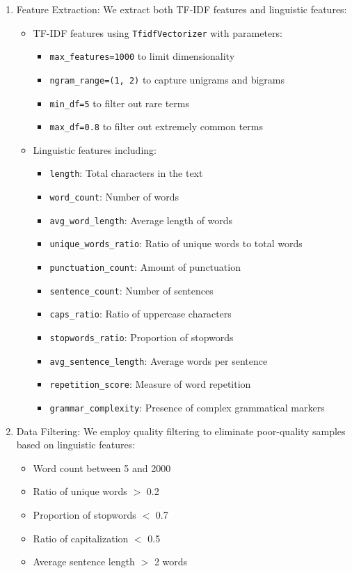 \begin{enumerate}
    \item Feature Extraction: We extract both TF-IDF features and linguistic features:
    \begin{itemize}
        \item TF-IDF features using \texttt{TfidfVectorizer} with parameters:
        \begin{itemize}
            \item \texttt{max\_features=1000} to limit dimensionality
            \item \texttt{ngram\_range=(1, 2)} to capture unigrams and bigrams
            \item \texttt{min\_df=5} to filter out rare terms
            \item \texttt{max\_df=0.8} to filter out extremely common terms
        \end{itemize}
        \item Linguistic features including:
        \begin{itemize}
            \item \texttt{length}: Total characters in the text
            \item \texttt{word\_count}: Number of words
            \item \texttt{avg\_word\_length}: Average length of words
            \item \texttt{unique\_words\_ratio}: Ratio of unique words to total words
            \item \texttt{punctuation\_count}: Amount of punctuation
            \item \texttt{sentence\_count}: Number of sentences
            \item \texttt{caps\_ratio}: Ratio of uppercase characters
            \item \texttt{stopwords\_ratio}: Proportion of stopwords
            \item \texttt{avg\_sentence\_length}: Average words per sentence
            \item \texttt{repetition\_score}: Measure of word repetition
            \item \texttt{grammar\_complexity}: Presence of complex grammatical markers
        \end{itemize}
    \end{itemize}

    \item Data Filtering: We employ quality filtering to eliminate poor-quality samples based on linguistic features:
    \begin{itemize}
        \item Word count between 5 and 2000
        \item Ratio of unique words $>$ 0.2
        \item Proportion of stopwords $<$ 0.7
        \item Ratio of capitalization $<$ 0.5
        \item Average sentence length $>$ 2 words
    \end{itemize}


\end{enumerate}
